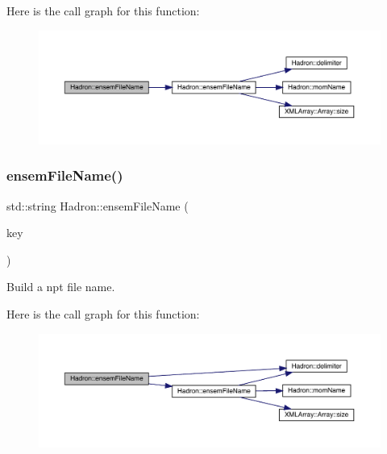 Here is the call graph for this function\+:\nopagebreak
\begin{figure}[H]
\begin{center}
\leavevmode
\includegraphics[width=350pt]{d1/daf/namespaceHadron_aa7a6f1af8bf69b8a63890e92bfaaf738_cgraph}
\end{center}
\end{figure}
\mbox{\label{namespaceHadron_a535351e28134f75011451a8b7b5f7cb4}} 
\subsubsection{\texorpdfstring{ensemFileName()}{ensemFileName()}\hspace{0.1cm}{\footnotesize\ttfamily [12/12]}}
{\footnotesize\ttfamily std\+::string Hadron\+::ensem\+File\+Name (\begin{DoxyParamCaption}\item[{const \mbox{\hyperlink{structHadron_1_1KeyHadronSUNNPartNPtCorr__t}{Hadron\+::\+Key\+Hadron\+S\+U\+N\+N\+Part\+N\+Pt\+Corr\+\_\+t}} \&}]{key }\end{DoxyParamCaption})}



Build a npt file name. 

Here is the call graph for this function\+:\nopagebreak
\begin{figure}[H]
\begin{center}
\leavevmode
\includegraphics[width=350pt]{d1/daf/namespaceHadron_a535351e28134f75011451a8b7b5f7cb4_cgraph}
\end{center}
\end{figure}
\mbox{\label{namespaceHadron_a0b8fc65d4da647ad0c70885da63e157e}} 
